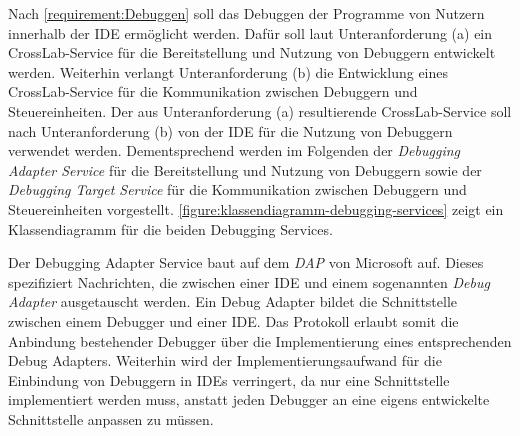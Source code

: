 Nach \autoref{requirement:Debuggen} soll das Debuggen der Programme von Nutzern innerhalb der IDE ermöglicht werden. Dafür soll laut Unteranforderung (a) ein CrossLab-Service für die Bereitstellung und Nutzung von Debuggern entwickelt werden. Weiterhin verlangt Unteranforderung (b) die Entwicklung eines CrossLab-Service für die Kommunikation zwischen Debuggern und Steuereinheiten. Der aus Unteranforderung (a) resultierende CrossLab-Service soll nach Unteranforderung (b) von der IDE für die Nutzung von Debuggern verwendet werden. Dementsprechend werden im Folgenden der \textit{Debugging Adapter Service} für die Bereitstellung und Nutzung von Debuggern sowie der \textit{Debugging Target Service} für die Kommunikation zwischen Debuggern und Steuereinheiten vorgestellt. \autoref{figure:klassendiagramm-debugging-services} zeigt ein Klassendiagramm für die beiden Debugging Services.

Der Debugging Adapter Service baut auf dem \textit{\ac{DAP}} \cite{noauthor_debug-adapter-protocol_nodate} von Microsoft auf. Dieses spezifiziert Nachrichten, die zwischen einer IDE und einem sogenannten \textit{Debug Adapter} ausgetauscht werden. Ein Debug Adapter bildet die Schnittstelle zwischen einem Debugger und einer IDE. Das Protokoll erlaubt somit die Anbindung bestehender Debugger über die Implementierung eines entsprechenden Debug Adapters. Weiterhin wird der Implementierungsaufwand für die Einbindung von Debuggern in IDEs verringert, da nur eine Schnittstelle implementiert werden muss, anstatt jeden Debugger an eine eigens entwickelte Schnittstelle anpassen zu müssen.

